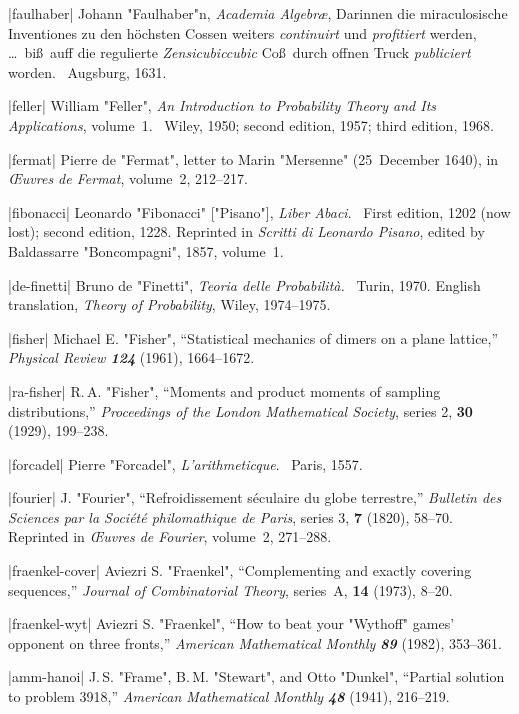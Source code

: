 \bib|faulhaber|%
Johann "Faulhaber"n, {\sl Academia Algebr\ae}, Darinnen die miraculosische
Inventiones zu den h\"ochsten Cossen weiters {\it continuirt\/} und
{\it profitiert\/} werden, \dots~bi\ss\ auff die regulierte
{\it Zensicubiccubic\/} Co\ss\ durch offnen Truck {\it publiciert\/} worden. \
Augsburg, 1631.

\bib|feller|%
William "Feller", {\sl An Introduction to Probability Theory and
Its Applications}, volume~1. \
Wiley, 1950; second edition, 1957; third edition, 1968.

\bib|fermat|%
Pierre de "Fermat", letter to Marin "Mersenne" (25~December 1640), in
{\sl \OE uvres de Fermat}, volume~2, 212--217.

\bib|fibonacci|%
Leonardo "Fibonacci" ["Pisano"], {\sl Liber Abaci}. \
First edition, 1202 (now lost); second edition, 1228. Reprinted in
{\sl Scritti di Leonardo Pisano}, edited by Baldassarre "Boncompagni",
1857, volume~1.

\bib|de-finetti|%
Bruno de "Finetti", {\sl Teoria delle Probabilit\`a.} \ Turin, 1970.
English translation, {\sl Theory of Probability}, Wiley, 1974--1975.

\bib|fisher|%
Michael E. "Fisher", ``Statistical mechanics of dimers on a plane
lattice,'' {\sl Physical Review\/ \bf124} (1961), 1664--1672.

\bib|ra-fisher|%
R.\,A. "Fisher", ``Moments and product moments of sampling distributions,''
{\sl Proceedings of the London Mathematical Society}, series 2,
{\bf30} (1929), 199--238.

\bib|forcadel|%
Pierre "Forcadel", {\sl L'arithmeticque}. \ Paris, 1557.

\bib|fourier|%
J. "Fourier", ``Refroidissement s\'eculaire du globe terrestre,''
{\sl Bulletin des Sciences par la Soci\'et\'e philomathique de Paris}, series 3,
{\bf7} (1820), 58--70. Reprinted in {\sl \OE uvres de Fourier}, volume~2,
271--288.

\bib|fraenkel-cover|%
Aviezri S. "Fraenkel", ``Complementing and exactly covering sequences,''
{\sl Journal of Combinatorial Theory}, series~A, {\bf14} (1973), 8--20.

\bib|fraenkel-wyt|%
Aviezri S. "Fraenkel", ``How to beat your "Wythoff" games' opponent on three
fronts,'' {\sl American Mathematical Monthly\/ \bf89} (1982), 353--361.

\bib|amm-hanoi|%
J.\,S. "Frame", B.\,M. "Stewart", and Otto "Dunkel",
``Partial solution to problem 3918,''
{\sl American Mathematical Monthly\/ \bf48} (1941), 216--219.

